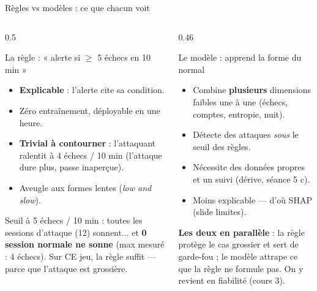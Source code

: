 \begin{frame}{Règles vs modèles : ce que chacun voit}
\footnotesize%
\begin{columns}[t]
\begin{column}{0.5\textwidth}
\begin{block}{La règle : « alerte si $\ge$ 5 échecs en 10 min »}
\begin{itemize}
\item \ok{} \textbf{Explicable} : l'alerte cite sa condition.
\item \ok{} Zéro entraînement, déployable en une heure.
\item \nok{} \textbf{Trivial à contourner} : l'attaquant ralentit à
4 échecs / 10 min (l'attaque dure plus, passe inaperçue).
\item \nok{} Aveugle aux formes lentes (\emph{low and slow}).
\end{itemize}
\end{block}
\begin{ebox}
Seuil à 5 échecs / 10 min : toutes les sessions d'attaque (12) sonnent...
et \textbf{0 session normale ne sonne} (max mesuré : 4 échecs). Sur CE jeu,
la règle suffit --- parce que l'attaque est grossière.
\end{ebox}
\end{column}
\begin{column}{0.46\textwidth}
\begin{block}{Le modèle : apprend la forme du normal}
\begin{itemize}
\item \ok{} Combine \textbf{plusieurs} dimensions faibles une à une
(échecs, comptes, entropie, nuit).
\item \ok{} Détecte des attaques \emph{sous} le seuil des règles.
\item \nok{} Nécessite des données propres et un suivi (dérive, séance 5 c).
\item \nok{} Moins explicable --- d'où SHAP (slide limites).
\end{itemize}
\end{block}
\begin{kbox}
\textbf{Les deux en parallèle} : la règle protège le cas grossier et sert de
garde-fou ; le modèle attrape ce que la règle ne formule pas. On y revient en
fiabilité (cours 3).
\end{kbox}
\end{column}
\end{columns}
\end{frame}


